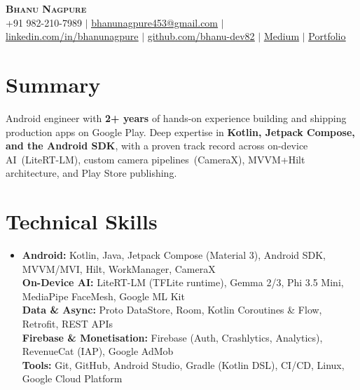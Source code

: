 \documentclass[letterpaper,10pt]{article}
\newcommand{\resumeSubHeadingListStart}{\begin{itemize}[leftmargin=0.13in, label={}]}
\newcommand{\resumeSubHeadingListEnd}{\end{itemize}}
\begin{document}
\begin{center}
    {\LARGE\bfseries\scshape Bhanu Nagpure} \\ \vspace{3pt}
    \small +91 982-210-7989 $|$
    \href{mailto:bhanunagpure453@gmail.com}{\underline{bhanunagpure453@gmail.com}} $|$
    \href{https://www.linkedin.com/in/bhanunagpure/}{\underline{linkedin.com/in/bhanunagpure}} $|$
    \href{https://github.com/bhanu-dev82}{\underline{github.com/bhanu-dev82}} $|$
    \href{https://medium.com/@bhanu.r.nagpure.8082}{\underline{Medium}} $|$
    \href{https://bhanu-dev82.github.io}{\underline{Portfolio}}
\end{center}

\vspace{-4pt}

\section{Summary}
\small{Android engineer with \textbf{2+ years} of hands-on experience building and shipping production apps on Google Play. Deep expertise in \textbf{Kotlin, Jetpack Compose, and the Android SDK}, with a proven track record across on-device AI~(LiteRT-LM), custom camera pipelines~(CameraX), MVVM+Hilt architecture, and Play Store publishing.}
\vspace{-4pt}

\section{Technical Skills}
\resumeSubHeadingListStart
  \item\small{
    \textbf{Android:} Kotlin, Java, Jetpack Compose (Material 3), Android SDK, MVVM/MVI, Hilt, WorkManager, CameraX \\[1pt]
    \textbf{On-Device AI:} LiteRT-LM (TFLite runtime), Gemma 2/3, Phi 3.5 Mini, MediaPipe FaceMesh, Google ML Kit \\[1pt]
    \textbf{Data \& Async:} Proto DataStore, Room, Kotlin Coroutines \& Flow, Retrofit, REST APIs \\[1pt]
    \textbf{Firebase \& Monetisation:} Firebase (Auth, Crashlytics, Analytics), RevenueCat (IAP), Google AdMob \\[1pt]
    \textbf{Tools:} Git, GitHub, Android Studio, Gradle (Kotlin DSL), CI/CD, Linux, Google Cloud Platform
  }
\resumeSubHeadingListEnd
\vspace{-2pt}
\end{document}
